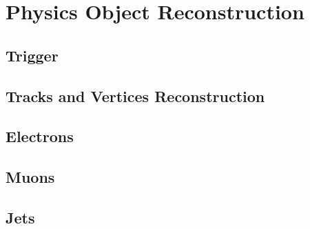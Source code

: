 \section{ Physics Object Reconstruction} 
\label{sec:ParticleReconstruction}

\subsection{Trigger}
\label{subsec:TriggerATLAS}

\subsection{Tracks and Vertices Reconstruction}
\label{subsec:Tracking}

\subsection{Electrons}
\label{subsec:ParticleRecon_Elec}

\subsection{Muons}
\label{subsec:ParticleRecon_Muon}

\subsection{Jets}
\label{subsec:ParticleRecon_Jets}